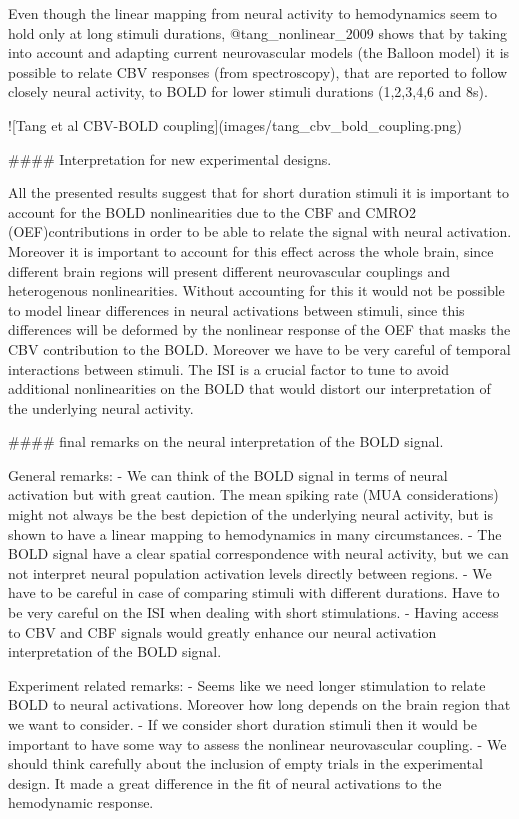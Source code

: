 Even though the linear mapping from neural activity to hemodynamics seem to hold only at long stimuli durations, @tang_nonlinear_2009 shows that by taking into account and adapting current neurovascular models (the Balloon model) it is possible to relate CBV responses (from spectroscopy), that are reported to follow closely neural activity, to BOLD for lower stimuli durations (1,2,3,4,6 and 8s).

![Tang et al CBV-BOLD coupling](images/tang_cbv_bold_coupling.png)

#### Interpretation for new experimental designs.

All the presented results suggest that for short duration stimuli it is important to account for the BOLD nonlinearities due to the CBF and CMRO2 (OEF)contributions in order to be able to relate the signal with neural activation. Moreover it is important to account for this effect across the whole brain, since different brain regions will present different neurovascular couplings and heterogenous nonlinearities. Without accounting for this it would not be possible to model linear differences in neural activations between stimuli, since this differences will be deformed by the nonlinear response of the OEF that masks the CBV contribution to the BOLD. Moreover we have to be very careful of temporal interactions between stimuli. The ISI is a crucial factor to tune to avoid additional nonlinearities on the BOLD that would distort our interpretation of the underlying neural activity.

#### final remarks on the neural interpretation of the BOLD signal.

General remarks:
- We can think of the BOLD signal in terms of neural activation but with great caution. The mean spiking rate (MUA considerations) might not always be the best depiction of the underlying neural activity, but is shown to have a linear mapping to hemodynamics in many circumstances.
- The BOLD signal have a clear spatial correspondence with neural activity, but we can not interpret neural population activation levels directly between regions.
- We have to be careful in case of comparing stimuli with different durations. Have to be very careful on the ISI when dealing with short stimulations.
- Having access to CBV and CBF signals would greatly enhance our neural activation interpretation of the BOLD signal.

Experiment related remarks:
- Seems like we need longer stimulation to relate BOLD to neural activations. Moreover how long depends on the brain region that we want to consider.
- If we consider short duration stimuli then it would be important to have some way to assess the nonlinear neurovascular coupling.
- We should think carefully about the inclusion of empty trials in the experimental design. It made a great difference in the fit of neural activations to the hemodynamic response.







